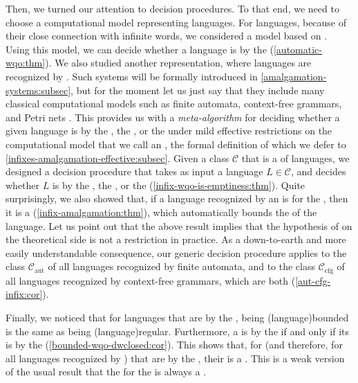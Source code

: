Then, we turned our attention to decision procedures. To that end, we need to
choose a computational model representing languages. For 
languages, because of their close connection with infinite words, we considered
a model based on . Using this model, we can decide
whether a language is  by the 
(\cref{automatic-wqo:thm}). We also studied another representation, where
languages are recognized by  \cite{ASZZ24}. Such
systems will be formally introduced in \cref{amalgamation-systems:subsec}, but
for the moment let us just say that they include many classical computational
models such as finite automata, context-free grammars, and Petri nets
\cite{ASZZ24}. This provides us with a \emph{meta-algorithm} for deciding
whether a given language is  by the , the , or the  under mild
effective restrictions on the computational model that we call an , the formal definition of which we defer to
\cref{infixes-amalgamation-effective:subsec}. Given a class $\mathcal{C}$ that
is a  of languages, we designed a
decision procedure that takes as input a language $L \in \mathcal{C}$, and
decides whether $L$ is  by the , the
, or the 
(\cref{infix-wqo-is-emptiness:thm}). Quite surprisingly, we also showed that,
if a language recognized by an  is
 for the , then it is a  (\cref{infix-amalgamation:thm}), which automatically bounds the
 of the language. Let us point out that the above result
implies that the hypothesis of  on the theoretical side
is not a restriction in practice. As a down-to-earth and more easily
understandable consequence, our generic decision procedure applies to the class
$\mathcal{C}_\text{aut}$ of all languages recognized by finite automata, and to
the class $\mathcal{C}_\text{cfg}$ of all languages recognized by context-free
grammars, which are both 
(\cref{aut-cfg-infix:cor}).

Finally, we noticed that for  languages that are
 by the , being
\kl(language){bounded} is the same as being \kl(language){regular}.
Furthermore, a  is  by the
 if and only if its  is
 by the 
(\cref{bounded-wqo-dwclosed:cor}). This shows that, for 
(and therefore, for all languages recognized by ) that
are  by the , their  is a . This is a weak version of the usual result
that the  for the  is
always a .

